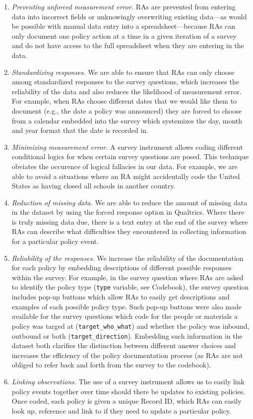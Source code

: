 \documentclass[]{article}
\begin{document}
\begin{enumerate}
\def\labelenumi{\arabic{enumi}.}
\item
  \emph{Preventing unforced measurement error.} RAs are prevented from entering data into incorrect fields or unknowingly overwriting existing data---as would be possible with manual data entry into a spreadsheet---because RAs can only document one policy action at a time in a given iteration of a survey and do not have access to the full spreadsheet when they are entering in the data.
\item
  \emph{Standardizing responses.} We are able to ensure that RAs can only choose among standardized responses to the survey questions, which increases the reliability of the data and also reduces the likelihood of measurement error. For example, when RAs choose different dates that we would like them to document (e.g., the date a policy was announced) they are forced to choose from a calendar embedded into the survey which systemizes the day, month and year format that the date is recorded in.
\item
  \emph{Minimizing measurement error.} A survey instrument allows coding different conditional logics for when certain survey questions are posed. This technique obviates the occurence of logical fallacies in our data. For example, we are able to avoid a situations where an RA might accidentally code the United States as having closed all schools in another country.
\item
  \emph{Reduction of missing data.} We are able to reduce the amount of missing data in the dataset by using the forced response option in Qualtrics. Where there is truly missing data due, there is a text entry at the end of the survey where RAs can describe what difficulties they encountered in collecting information for a particular policy event.
\item
  \emph{Reliability of the responses.} We increase the reliability of the documentation for each policy by embedding descriptions of different possible responses within the survey. For example, in the survey question where RAs are asked to identify the policy type (\texttt{type} variable, see Codebook), the survey question includes pop-up buttons which allow RAs to easily get descriptions and examples of each possible policy type. Such pop-up buttons were also made available for the survey questions which code for the people or materials a policy was targed at (\texttt{target\_who\_what}) and whether the policy was inbound, outbound or both (\texttt{target\_direction}). Embedding such information in the dataset both clarifies the distinction between different answer choices and increases the efficiency of the policy documentation process (as RAs are not obliged to refer back and forth from the survey to the codebook).
\item
  \emph{Linking observations.} The use of a survey instrument allows us to easily link policy events together over time should there be updates to existing policies. Once coded, each policy is given a unique Record ID, which RAs can easily look up, reference and link to if they need to update a particular policy.
\end{enumerate}
\end{document}
